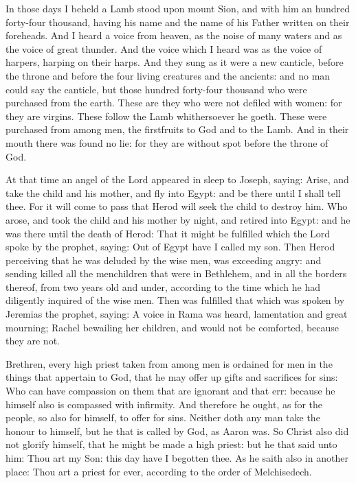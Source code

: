 



In those days I beheld a Lamb stood upon mount Sion, and with him an
hundred forty-four thousand, having his name and the name of his Father
written on their foreheads.
And I heard a voice from heaven, as the noise of many waters and
as the voice of great thunder. And the voice which I heard was as the
voice of harpers, harping on their harps.
And they sung as it were a new canticle, before the throne and
before the four living creatures and the ancients: and no man could say
the canticle, but those hundred forty-four thousand who were purchased
from the earth.
These are they who were not defiled with women: for they are
virgins. These follow the Lamb whithersoever he goeth.  These were
purchased from among men, the firstfruits to God and to the Lamb.
And in their mouth there was found no lie: for they are without
spot before the throne of God.



At that time an angel of the Lord appeared
in sleep to Joseph, saying: Arise, and take the child and his mother,
and fly into Egypt: and be there until I shall tell thee. For it will
come to pass that Herod will seek the child to destroy him.
Who arose, and took the child and his mother by night, and retired
into Egypt: and he was there until the death of Herod:
That it might be fulfilled which the Lord spoke by the prophet,
saying: Out of Egypt have I called my son.
Then Herod perceiving that he was deluded by the wise men, was
exceeding angry: and sending killed all the menchildren that were in
Bethlehem, and in all the borders thereof, from two years old and under,
according to the time which he had diligently inquired of the wise men.
Then was fulfilled that which was spoken by Jeremias the prophet,
saying:
A voice in Rama was heard, lamentation and great mourning; Rachel
bewailing her children, and would not be comforted, because they are
not.



\bigskip




Brethren, every high priest taken from among men is ordained for men in
the things that appertain to God, that he may offer up gifts and
sacrifices for sins:
Who can have compassion on them that are ignorant and that err:
because he himself also is compassed with infirmity.
And therefore he ought, as for the people, so also for himself, to
offer for sins.
Neither doth any man take the honour to himself, but he that is
called by God, as Aaron was.
So Christ also did not glorify himself, that he might be made a
high priest: but he that said unto him: Thou art my Son: this day have I
begotten thee.
As he saith also in another place: Thou art a priest for ever,
according to the order of Melchisedech.


